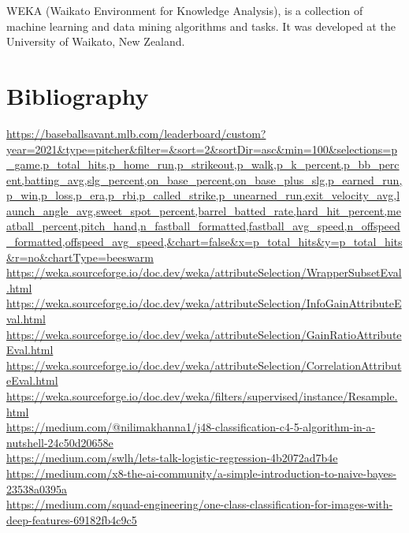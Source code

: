 \documentclass[12pt]{article}
\begin{document}
WEKA (Waikato Environment for Knowledge Analysis), is a collection of machine learning and data mining algorithms and tasks. It was developed at the University of Waikato, New Zealand. 

\newpage
\section{Bibliography}
\url{https://baseballsavant.mlb.com/leaderboard/custom?year=2021&type=pitcher&filter=&sort=2&sortDir=asc&min=100&selections=p_game,p_total_hits,p_home_run,p_strikeout,p_walk,p_k_percent,p_bb_percent,batting_avg,slg_percent,on_base_percent,on_base_plus_slg,p_earned_run,p_win,p_loss,p_era,p_rbi,p_called_strike,p_unearned_run,exit_velocity_avg,launch_angle_avg,sweet_spot_percent,barrel_batted_rate,hard_hit_percent,meatball_percent,pitch_hand,n_fastball_formatted,fastball_avg_speed,n_offspeed_formatted,offspeed_avg_speed,&chart=false&x=p_total_hits&y=p_total_hits&r=no&chartType=beeswarm} \\
\url{https://weka.sourceforge.io/doc.dev/weka/attributeSelection/WrapperSubsetEval.html} \\
\url{https://weka.sourceforge.io/doc.dev/weka/attributeSelection/InfoGainAttributeEval.html} \\
\url{https://weka.sourceforge.io/doc.dev/weka/attributeSelection/GainRatioAttributeEval.html} \\
\url{https://weka.sourceforge.io/doc.dev/weka/attributeSelection/CorrelationAttributeEval.html} \\
\url{https://weka.sourceforge.io/doc.dev/weka/filters/supervised/instance/Resample.html} \\
\url{https://medium.com/@nilimakhanna1/j48-classification-c4-5-algorithm-in-a-nutshell-24c50d20658e} \\
\url{https://medium.com/swlh/lets-talk-logistic-regression-4b2072ad7b4e} \\
\url{https://medium.com/x8-the-ai-community/a-simple-introduction-to-naive-bayes-23538a0395a} \\
\url{https://medium.com/squad-engineering/one-class-classification-for-images-with-deep-features-69182fb4c9c5}
\end{document}
